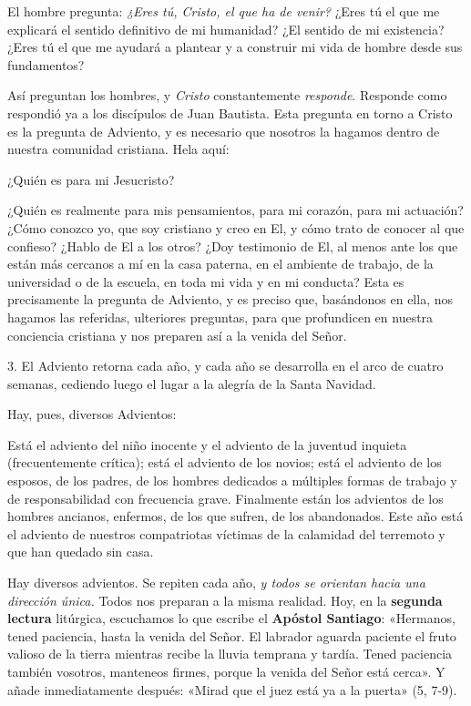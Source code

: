 \begin{body}
					El hombre pregunta: \emph{¿Eres tú, Cristo, el que ha de venir?} ¿Eres tú el que me explicará el sentido definitivo de mi humanidad? ¿El sentido de mi existencia? ¿Eres tú el que me ayudará a plantear y a construir mi vida de hombre desde sus fundamentos? 
					
					Así preguntan los hombres, y \emph{Cristo} constantemente \emph{responde}. Responde como respondió ya a los discípulos de Juan Bautista. Esta pregunta en torno a Cristo es la pregunta de Adviento, y es necesario que nosotros la hagamos dentro de nuestra comunidad cristiana. Hela aquí: 
					
					¿Quién es para mi Jesucristo? 
					
					¿Quién es realmente para mis pensamientos, para mi corazón, para mi actuación? ¿Cómo conozco yo, que soy cristiano y creo en El, y cómo trato de conocer al que confieso? ¿Hablo de El a los otros? ¿Doy testimonio de El, al menos ante los que están más cercanos a mí en la casa paterna, en el ambiente de trabajo, de la universidad o de la escuela, en toda mi vida y en mi conducta? Esta es precisamente la pregunta de Adviento, y es preciso que, basándonos en ella, nos hagamos las referidas, ulteriores preguntas, para que profundicen en nuestra conciencia cristiana y nos preparen así a la venida del Señor. 
					
					3. El Adviento retorna cada año, y cada año se desarrolla en el arco de cuatro semanas, cediendo luego el lugar a la alegría de la Santa Navidad. 
					
					Hay, pues, diversos Advientos: 
					
					Está el adviento del niño inocente y el adviento de la juventud inquieta (frecuentemente crítica); está el adviento de los novios; está el adviento de los esposos, de los padres, de los hombres dedicados a múltiples formas de trabajo y de responsabilidad con frecuencia grave. Finalmente están los advientos de los hombres ancianos, enfermos, de los que sufren, de los abandonados. Este año está el adviento de nuestros compatriotas víctimas de la calamidad del terremoto y que han quedado sin casa.
					
					Hay diversos advientos. Se repiten cada año, \emph{y todos se orientan hacia una dirección única.} Todos nos preparan a la misma realidad. Hoy, en la \textbf{segunda lectura} litúrgica, escuchamos lo que escribe el \textbf{Apóstol Santiago}: «Hermanos, tened paciencia, hasta la venida del Señor. El labrador aguarda paciente el fruto valioso de la tierra mientras recibe la lluvia temprana y tardía. Tened paciencia también vosotros, manteneos firmes, porque la venida del Señor está cerca». Y añade inmediatamente después: «Mirad que el juez está ya a la puerta» (5, 7-9).
					

\end{body}
